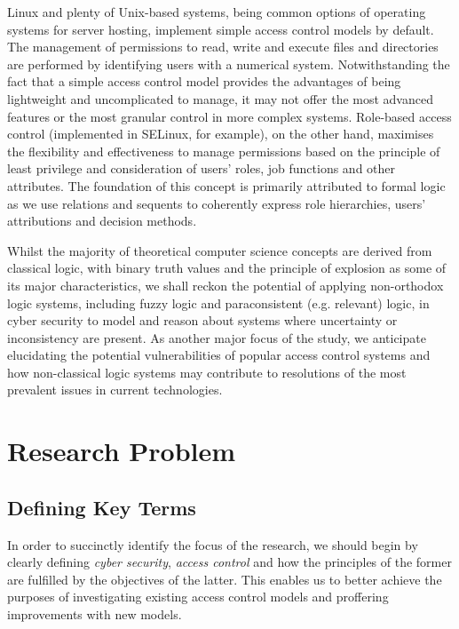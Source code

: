 \documentclass{article}
\begin{document}
Linux and plenty of Unix-based systems, being common options of operating
systems for server hosting, implement simple access control models
by default. The management of permissions to read, write and execute
files and directories are performed by identifying users with a numerical
system.\cite{ubuntu} Notwithstanding the fact that a simple access control
model provides the advantages of being lightweight and uncomplicated to
manage, it may not offer the most advanced features or the most granular
control in more complex systems. Role-based access control (implemented
in SELinux, for example), on the other hand, maximises the flexibility and
effectiveness to manage permissions based on the principle of least privilege
and consideration of users' roles, job functions and other attributes. The
foundation of this concept is primarily attributed to formal logic as we
use relations and sequents to coherently express role hierarchies, users'
attributions and decision methods.\cite{rbac}

Whilst the majority of theoretical computer science concepts are derived from
classical logic, with binary truth values and the principle of explosion
as some of its major characteristics, we shall reckon the potential of
applying non-orthodox logic systems, including fuzzy logic and paraconsistent
(e.g. relevant) logic, in cyber security to model and reason about systems
where uncertainty or inconsistency are present. As another major focus of the
study, we anticipate elucidating the potential vulnerabilities of popular
access control systems and how non-classical logic systems may contribute
to resolutions of the most prevalent issues in current technologies.

\section*{Research Problem}

\subsection*{Defining Key Terms}

In order to succinctly identify the focus of the research, we should begin
by clearly defining \textit{cyber security}, \textit{access control} and
how the principles of the former are fulfilled by the objectives of the
latter. This enables us to better achieve the purposes of investigating
existing access control models and proffering improvements with new models.
\end{document}
